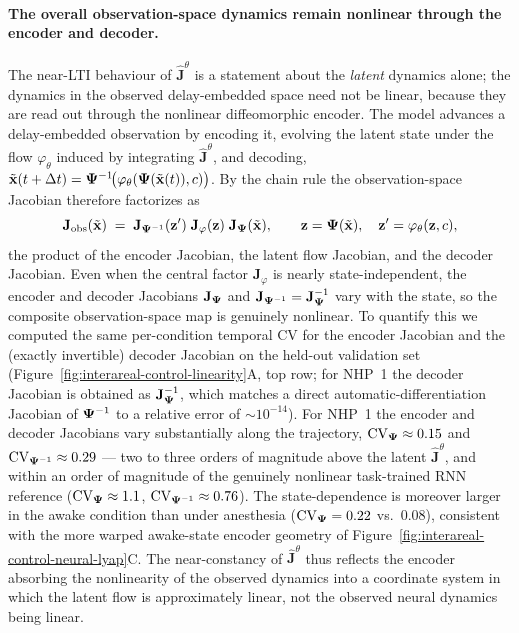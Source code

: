\paragraph{The overall observation-space dynamics remain nonlinear through the encoder and decoder.}
The near-LTI behaviour of $\hat{\mathbf{J}}^{\theta}$ is a statement about the \emph{latent} dynamics alone; the dynamics in the observed delay-embedded space need not be linear, because they are read out through the nonlinear diffeomorphic encoder. The model advances a delay-embedded observation by encoding it, evolving the latent state under the flow $\varphi_{\theta}$ induced by integrating $\hat{\mathbf{J}}^{\theta}$, and decoding, $\tilde{\vb{x}}(t+\Delta t)=\vb{\Psi}^{-1}\!\bigl(\varphi_{\theta}(\vb{\Psi}(\tilde{\vb{x}}(t)),c)\bigr)$. By the chain rule the observation-space Jacobian therefore factorizes as
\begin{equation}
\mathbf{J}_{\mathrm{obs}}(\tilde{\vb{x}})\;=\;\mathbf{J}_{\vb{\Psi}^{-1}}(\vb{z}')\;\mathbf{J}_{\varphi}(\vb{z})\;\mathbf{J}_{\vb{\Psi}}(\tilde{\vb{x}}),\qquad \vb{z}=\vb{\Psi}(\tilde{\vb{x}}),\quad \vb{z}'=\varphi_{\theta}(\vb{z},c),\label{eq:supp-interareal-control-obs-jac-chain}
\end{equation}
the product of the encoder Jacobian, the latent flow Jacobian, and the decoder Jacobian. Even when the central factor $\mathbf{J}_{\varphi}$ is nearly state-independent, the encoder and decoder Jacobians $\mathbf{J}_{\vb{\Psi}}$ and $\mathbf{J}_{\vb{\Psi}^{-1}}=\mathbf{J}_{\vb{\Psi}}^{-1}$ vary with the state, so the composite observation-space map is genuinely nonlinear. To quantify this we computed the same per-condition temporal CV for the encoder Jacobian and the (exactly invertible) decoder Jacobian on the held-out validation set (Figure~\ref{fig:interareal-control-linearity}A, top row; for NHP~1 the decoder Jacobian is obtained as $\mathbf{J}_{\vb{\Psi}}^{-1}$, which matches a direct automatic-differentiation Jacobian of $\vb{\Psi}^{-1}$ to a relative error of $\sim\!10^{-14}$). For NHP~1 the encoder and decoder Jacobians vary substantially along the trajectory, $\mathrm{CV}_{\vb{\Psi}}\approx0.15$ and $\mathrm{CV}_{\vb{\Psi}^{-1}}\approx0.29$ --- two to three orders of magnitude above the latent $\hat{\mathbf{J}}^{\theta}$, and within an order of magnitude of the genuinely nonlinear task-trained RNN reference ($\mathrm{CV}_{\vb{\Psi}}\approx1.1$, $\mathrm{CV}_{\vb{\Psi}^{-1}}\approx0.76$). The state-dependence is moreover larger in the awake condition than under anesthesia ($\mathrm{CV}_{\vb{\Psi}}=0.22$ vs.\ $0.08$), consistent with the more warped awake-state encoder geometry of Figure~\ref{fig:interareal-control-neural-lyap}C. The near-constancy of $\hat{\mathbf{J}}^{\theta}$ thus reflects the encoder absorbing the nonlinearity of the observed dynamics into a coordinate system in which the latent flow is approximately linear, not the observed neural dynamics being linear.

